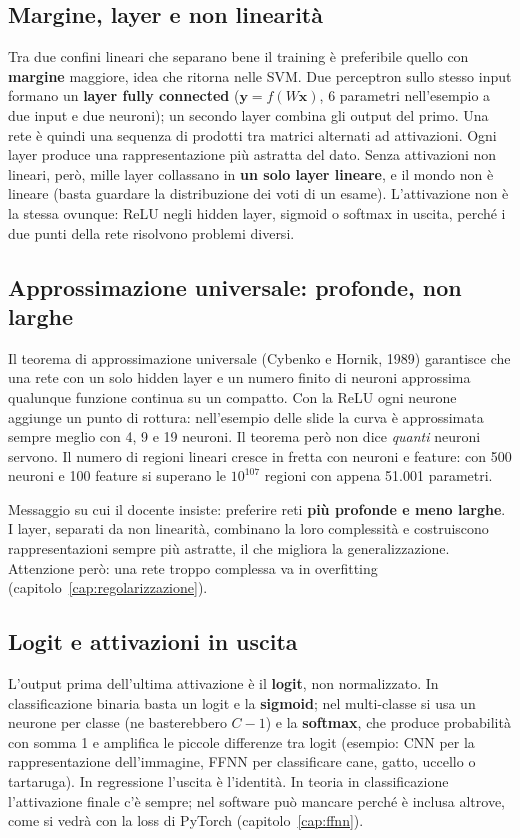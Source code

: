 \subsection{Margine, layer e non linearità}
Tra due confini lineari che separano bene il training è preferibile quello con \textbf{margine}
maggiore, idea che ritorna nelle SVM. Due perceptron sullo stesso input formano un \textbf{layer
fully connected} ($\mathbf{y} = f(W\mathbf{x})$, 6 parametri nell'esempio a due input e due neuroni);
un secondo layer combina gli output del primo. Una rete è quindi una sequenza di prodotti tra matrici
alternati ad attivazioni. Ogni layer produce una rappresentazione più astratta del dato. Senza
attivazioni non lineari, però, mille layer collassano in \textbf{un solo layer lineare}, e il mondo non è
lineare (basta guardare la distribuzione dei voti di un esame). L'attivazione non è la stessa ovunque:
ReLU negli hidden layer, sigmoid o softmax in uscita, perché i due punti della rete risolvono problemi
diversi.

\subsection{Approssimazione universale: profonde, non larghe}
Il teorema di approssimazione universale (Cybenko e Hornik, 1989) garantisce che una rete con un solo
hidden layer e un numero finito di neuroni approssima qualunque funzione continua su un compatto. Con
la ReLU ogni neurone aggiunge un punto di rottura: nell'esempio delle slide la curva è approssimata
sempre meglio con 4, 9 e 19 neuroni. Il teorema però non dice \emph{quanti} neuroni servono. Il numero
di regioni lineari cresce in fretta con neuroni e feature: con 500 neuroni e 100 feature si superano
le $10^{107}$ regioni con appena 51.001 parametri.

\begin{esame}
Messaggio su cui il docente insiste: preferire reti \textbf{più profonde e meno larghe}. I layer,
separati da non linearità, combinano la loro complessità e costruiscono rappresentazioni sempre più
astratte, il che migliora la generalizzazione. Attenzione però: una rete troppo complessa va in
overfitting (capitolo~\ref{cap:regolarizzazione}).
\end{esame}

\subsection{Logit e attivazioni in uscita}
L'output prima dell'ultima attivazione è il \textbf{logit}, non normalizzato. In classificazione
binaria basta un logit e la \textbf{sigmoid}; nel multi-classe si usa un neurone per classe (ne
basterebbero $C-1$) e la \textbf{softmax}, che produce probabilità con somma 1 e amplifica le piccole
differenze tra logit (esempio: CNN per la rappresentazione dell'immagine, FFNN per classificare
cane, gatto, uccello o tartaruga). In regressione l'uscita è l'identità. In teoria in classificazione
l'attivazione finale c'è sempre; nel software può mancare perché è inclusa altrove, come si vedrà con
la loss di PyTorch (capitolo~\ref{cap:ffnn}).

